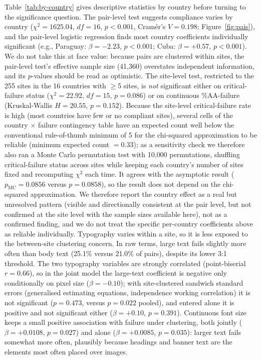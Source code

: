 \documentclass[10pt]{article}
\begin{document}
Table~\ref{tab:by-country} gives descriptive statistics by country before turning to the significance question. The pair-level test suggests compliance varies by country ($\chi^2 = 1625.04$, $df = 16$, $p < 0.001$, Cram\'{e}r's $V = 0.198$; Figure~\ref{fig:pais}), and the pair-level logistic regression finds most country coefficients individually significant (e.g., Paraguay: $\beta = -2.23$, $p<0.001$; Cuba: $\beta = +0.57$, $p<0.001$). We do not take this at face value: because pairs are clustered within sites, the pair-level test's effective sample size (41,360) overstates independent information, and its $p$-values should be read as optimistic. The site-level test, restricted to the 255 sites in the 16 countries with $\geq$5 sites, is \emph{not} significant either on critical-failure status ($\chi^2 = 22.92$, $df = 15$, $p = 0.086$) or on continuous \%AA-failure (Kruskal-Wallis $H = 20.55$, $p = 0.152$). Because the site-level critical-failure rate is high (most countries have few or no compliant sites), several cells of the country $\times$ failure contingency table have an expected count well below the conventional rule-of-thumb minimum of 5 for the chi-squared approximation to be reliable (minimum expected count $=0.33$); as a sensitivity check we therefore also ran a Monte Carlo permutation test with 10{,}000 permutations, shuffling critical-failure status across sites while keeping each country's number of sites fixed and recomputing $\chi^2$ each time. It agrees with the asymptotic result ($p_{\mathrm{MC}} = 0.0856$ versus $p = 0.0858$), so the result does not depend on the chi-squared approximation. We therefore report the country effect as a real but unresolved pattern (visible and directionally consistent at the pair level, but not confirmed at the site level with the sample sizes available here), not as a confirmed finding, and we do not treat the specific per-country coefficients above as reliable individually. Typography varies within a site, so it is less exposed to the between-site clustering concern. In raw terms, large text fails slightly more often than body text (25.1\% versus 21.0\% of pairs), despite its lower 3:1 threshold. The two typography variables are strongly correlated (point-biserial $r = 0.66$), so in the joint model the large-text coefficient is negative only conditionally on pixel size ($\beta = -0.10$); with site-clustered sandwich standard errors (generalised estimating equations, independence working correlation) it is not significant ($p = 0.473$, versus $p = 0.022$ pooled), and entered alone it is positive and not significant either ($\beta = +0.10$, $p = 0.391$). Continuous font size keeps a small positive association with failure under clustering, both jointly ($\beta = +0.0108$, $p = 0.027$) and alone ($\beta = +0.0085$, $p = 0.035$): larger text fails somewhat more often, plausibly because headings and banner text are the elements most often placed over images.
\end{document}
